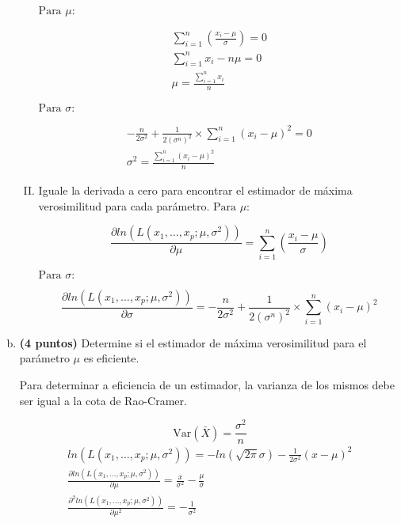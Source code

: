\documentclass[../main.tex]{subfiles}
\begin{document}
\begin{enumerate}[(a)]
\begin{enumerate}[(I)]
$\text{Para } \mu:$

\begin{equation}
\begin{split}
\sum_{i = 1}^{n} \left( \frac{x_i - \mu}{\sigma}\right) = 0 \\
\sum_{i = 1}^{n} x_i - n \mu = 0 \\
\mu = \frac{\sum_{i = 1}^{n} x_i}{n}
\end{split}
\end{equation}

$\text{Para } \sigma:$

\begin{equation}
\begin{split}
- \frac{n}{2 \sigma ^2} + \frac{1}{2 (\sigma ^n)^2} \times \sum_{i = 1}^{n} (x_i - \mu)^2 = 0 \\
\sigma ^2 = \frac{\sum_{i = 1}^{n} (x_i - \mu)^2}{n}
\end{split}
\end{equation}

\item Iguale la derivada a cero para encontrar el estimador de máxima verosimilitud para
cada parámetro.
$\text{Para } \mu:$

$$\frac{\partial ln(L(x_1, \dots, x_p; 	\mu, \sigma ^2))}{\partial \mu} = \sum_{i = 1}^{n} \left( \frac{x_i - \mu}{\sigma}\right)$$

$\text{Para } \sigma:$

$$\frac{\partial ln(L(x_1, \dots, x_p; 	\mu, \sigma ^2))}{\partial \sigma} = - \frac{n}{2 \sigma ^2} + \frac{1}{2 (\sigma ^n)^2} \times \sum_{i = 1}^{n} (x_i - \mu)^2$$

\end{enumerate}

\item \textbf{(4 puntos)} Determine si el estimador de máxima verosimilitud para el parámetro $\mu$ es eficiente.

Para determinar a eficiencia de un estimador, la varianza de los mismos debe ser igual a la cota de Rao-Cramer.

$$\text{Var}(\bar{X}) = \frac{\sigma ^2}{n}$$
\begin{equation}
\begin{split}
ln(L(x_1, \dots, x_p; 	\mu, \sigma ^2)) = - ln(\sqrt{2 \pi} \sigma) - \frac{1}{2\sigma ^ 2}(x - \mu)^2 \\
\frac{\partial ln(L(x_1, \dots, x_p; 	\mu, \sigma ^2))}{\partial \mu} = \frac{x}{\sigma ^2} - \frac{\mu}{\sigma} \\
\frac{\partial ^2 ln(L(x_1, \dots, x_p; 	\mu, \sigma ^2))}{\partial \mu ^2} = -\frac{1}{\sigma ^2}
\end{split}
\end{equation}


\end{enumerate}
\end{document}
